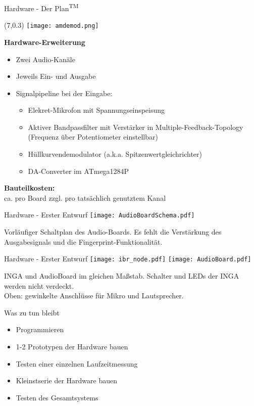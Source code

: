 \documentclass[fleqn,11pt]{beamer}
\begin{document}
\begin{frame}{Hardware - Der Plan\textsuperscript{\small{TM}}}
\begin{textblock}{7}(7,0.3)
\texttt{[image: amdemod.png]}
\end{textblock}
\vspace*{1.2cm}
	\textbf{Hardware-Erweiterung}
	\begin{itemize}
		\item Zwei Audio-Kanäle
		\item Jeweils Ein- und Ausgabe
		\item Signalpipeline  bei der Eingabe:
		\begin{itemize}
			\item Elekret-Mikrofon mit Spannungseinspeisung
			\item Aktiver Bandpassfilter mit Verstärker in Multiple-Feedback-Topology \\(Frequenz über Potentiometer einstellbar) 
			\item Hüllkurvendemodulator (a.k.a. Spitzenwertgleichrichter)
			\item DA-Converter im ATmega1284P
		\end{itemize}
	\end{itemize}
	\textbf{Bauteilkosten:}\\ ca.  pro Board zzgl.  pro tatsächlich genutztem Kanal
\end{frame}


\begin{frame}{Hardware - Erster Entwurf}
	\texttt{[image: AudioBoardSchema.pdf]}
	
	Vorläufiger Schaltplan des Audio-Boards. Es fehlt die Verstärkung des Ausgabesignals und die Fingerprint-Funktionalität.
\end{frame}

\begin{frame}{Hardware - Erster Entwurf}
	\texttt{[image: ibr\_node.pdf]}
	\texttt{[image: AudioBoard.pdf]}
	
	INGA und AudioBoard im gleichen Maßstab. Schalter und LEDs der INGA werden nicht verdeckt. \\
	Oben: gewinkelte Anschlüsse für Mikro und Lautsprecher.
\end{frame}


\begin{frame}{Was zu tun bleibt}
	\begin{itemize}
		\item Programmieren
		\item 1-2 Prototypen der Hardware bauen
		\item Testen einer einzelnen Laufzeitmessung
		\item Kleinstserie der Hardware bauen
		\item Testen des Gesamtsystems
	\end{itemize}
\end{frame}
\end{document}

